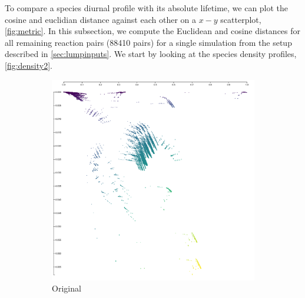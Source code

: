   To compare a species diurnal profile with its absolute lifetime, we can plot the cosine and euclidian distance against each other on a $x-y$ scatterplot, \autoref{fig:metric}. In this subsection, we compute the Euclidean and cosine distances for all remaining reaction pairs (88410 pairs) for a single simulation from the setup described in \autoref{sec:lumpinputs}. We start by looking at the species density profiles, \autoref{fig:density2}.




  \begin{figure}[H]
  \begin{subfigure}[t]{.5\textwidth}
    \centering
    \includegraphics[width=\textwidth]{fig/metric-1.png}
    \caption{Original}
    \label{fig:morig}
  \end{subfigure}%
  \begin{subfigure}[t]{.5\textwidth}

\end{subfigure}
\end{figure}
